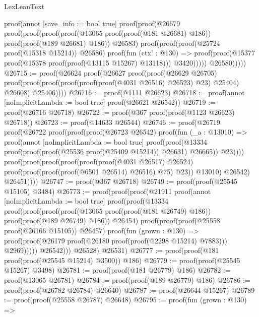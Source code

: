 \begin{lexlean}{LexLeanText}
\begin{coremodule}
          proof(annot [save_info := bool true]
            proof(proof(@26679
                  proof(proof(proof(proof(@13065 proof(proof(@181 @26681) @186))
                          proof(proof(@189 @26681) @186))
                        @26583)
                      proof(proof(proof(@25724 proof(@15318 @15214)) @26586)
                          proof(fun (ctx' : @130) =>
                            proof(proof(@15377 proof(@15378 proof(proof(@13115 @15267) @13118)))
                                @3420)))))
                @26580)))))
@26715 := proof(@26624
      proof(@26627
          proof(proof(@26629 @26705)
              proof(proof(proof(proof(proof(proof(@4031 @26516) @26523) @23) @25404) @26608)
                  @25406))))
@26716 := proof(@1111 @26623)
@26718 := proof(annot [noImplicitLambda := bool true] proof(@26621 @26542))
@26719 := proof(@26716 @26718)
@26722 := proof(@367 proof(proof(@1123 @26623) @26718))
@26723 := proof(@14633 @26544)
@26746 := proof(@26719
      proof(@26722
          proof(proof(proof(@26723 @26542)
                proof(fun (_a : @13010) =>
                  proof(annot [noImplicitLambda := bool true]
                    proof(proof(@13334
                          proof(proof(proof(@25536 proof(@25409 @15214)) @26631) @26665))
                        @23))))
              proof(proof(proof(proof(proof(proof(@4031 @26517) @26524)
                        proof(proof(proof(proof(@6501 @26514) @26516) @75) @23))
                      @13010)
                    @26542)
                  @26451))))
@26747 := proof(@367 @26718)
@26749 := proof(proof(@25545 @15105) @3484)
@26773 := proof(proof(proof(@21911
          proof(annot [noImplicitLambda := bool true]
            proof(proof(@13334
                  proof(proof(proof(proof(@13065 proof(proof(@181 @26749) @186))
                          proof(proof(@189 @26749) @186))
                        @26454)
                      proof(proof(proof(@25558 proof(@26166 @15105)) @26457)
                          proof(fun (grown : @130) =>
                            proof(proof(@26179 proof(@26180 proof(proof(@2298 @15214) @7883)))
                                @2969)))))
                @26542)))
        @26528)
      @26531)
@26777 := proof(proof(@181 proof(proof(@25545 @15214) @3500)) @186)
@26779 := proof(proof(@25545 @15267) @3498)
@26781 := proof(proof(@181 @26779) @186)
@26782 := proof(@13065 @26781)
@26784 := proof(proof(@189 @26779) @186)
@26786 := proof(proof(@26782 @26784) @26640)
@26787 := proof(@26644 @15267)
@26789 := proof(proof(@25558 @26787) @26648)
@26795 := proof(fun (grown : @130) =>

\end{coremodule}
\end{lexlean}
